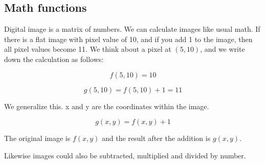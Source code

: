 \subsection{Math functions}

Digital image is a matrix of numbers. We can calculate images like usual
math. If there is a flat image with pixel value of 10, and if you add 1
to the image, then all pixel values become 11. We think about a pixel
at $(5, 10)$, and we write down the calculation as follows:

\begin{equation}
f(5, 10) = 10
\end{equation}

\begin{equation}
g(5,10) = f (5, 10) +1 = 11
\end{equation}

We generalize this. x and y are the coordinates within the image.

\begin{equation}
g( x , y ) = f (x, y) + 1
\end{equation}

The original image is $f(x, y)$ and the result after the addition
is $g(x, y)$. 

Likewise images could also be subtracted, multiplied and divided by
number. 

